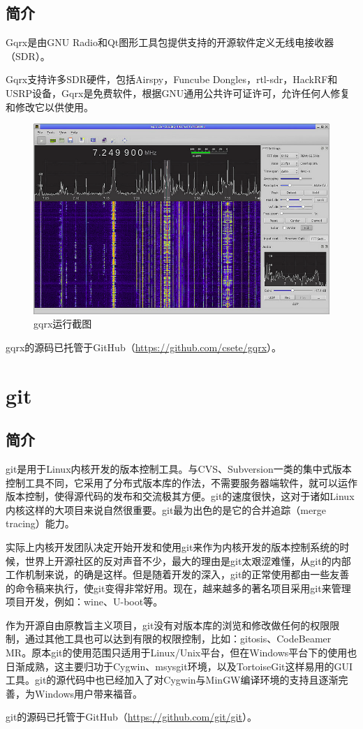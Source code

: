 		\subsection{简介}
			\par Gqrx是由GNU Radio和Qt图形工具包提供支持的开源软件定义无线电接收器（SDR）。
			\par Gqrx支持许多SDR硬件，包括Airspy，Funcube Dongles，rtl-sdr，HackRF和USRP设备，Gqrx是免费软件，根据GNU通用公共许可证许可，允许任何人修复和修改它以供使用。
			\begin{figure}[htb]
				\centering
				\includegraphics[width=13cm]{figures/gqrx.png}
				\caption{gqrx运行截图}
				\label{fig:gqrx运行截图}
			\end{figure}
			\par gqrx的源码已托管于GitHub（\href{https://github.com/csete/gqrx}{https://github.com/csete/gqrx}）。
	\section{git}
		\subsection{简介}
			\par git是用于Linux内核开发的版本控制工具。与CVS、Subversion一类的集中式版本控制工具不同，它采用了分布式版本库的作法，不需要服务器端软件，就可以运作版本控制，使得源代码的发布和交流极其方便。git的速度很快，这对于诸如Linux内核这样的大项目来说自然很重要。git最为出色的是它的合并追踪（merge tracing）能力。
			\par 实际上内核开发团队决定开始开发和使用git来作为内核开发的版本控制系统的时候，世界上开源社区的反对声音不少，最大的理由是git太艰涩难懂，从git的内部工作机制来说，的确是这样。但是随着开发的深入，git的正常使用都由一些友善的命令稿来执行，使git变得非常好用。现在，越来越多的著名项目采用git来管理项目开发，例如：wine、U-boot等。
			\par 作为开源自由原教旨主义项目，git没有对版本库的浏览和修改做任何的权限限制，通过其他工具也可以达到有限的权限控制，比如：gitosis、CodeBeamer MR。原本git的使用范围只适用于Linux/Unix平台，但在Windows平台下的使用也日渐成熟，这主要归功于Cygwin、msysgit环境，以及TortoiseGit这样易用的GUI工具。git的源代码中也已经加入了对Cygwin与MinGW编译环境的支持且逐渐完善，为Windows用户带来福音。\cite{ wiki:Git}
			\par git的源码已托管于GitHub（\href{https://github.com/git/git}{https://github.com/git/git}）。
